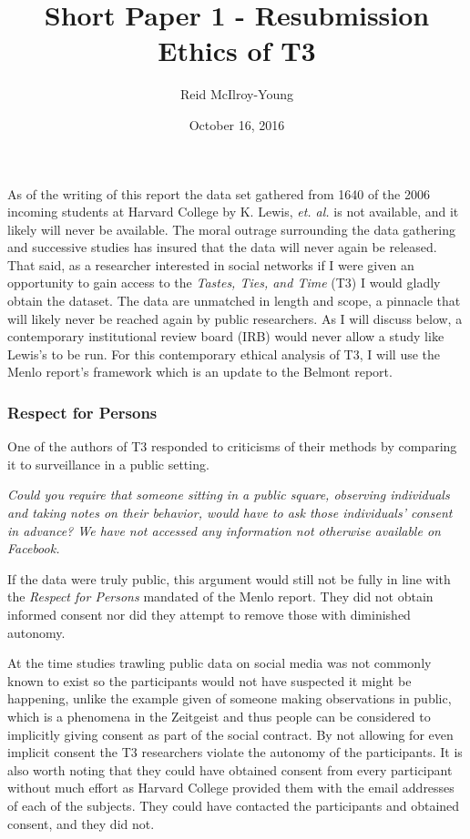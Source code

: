 \documentclass[10pt,a4paper,twocolumn]{article}
\author{Reid McIlroy-Young}
\title{Short Paper 1 - Resubmission\\Ethics of T3}
\date{October 16, 2016}
\begin{document}
\setlength{\droptitle}{-60pt}
\maketitle

As of the writing of this report the data set gathered from 1640 of the 2006 incoming students at Harvard College\cite{zimmerblog} by K. Lewis, \textit{et. al.}\cite{t3} is not available\cite{t3site}, and it likely will never be available. The moral outrage\cite{zimethics} surrounding the data gathering\cite{t3} and successive studies\cite{t3followup1}\cite{t3followup2} has insured that the data will never again be released. That said, as a researcher interested in social networks if I were given an opportunity to gain access to the \textit{Tastes, Ties, and Time} (T3) I would gladly obtain the dataset. The data are unmatched in length and scope, a pinnacle that will likely never be reached again by public researchers. As I will discuss below, a contemporary institutional review board (IRB) would never allow a study like Lewis's to be run. For this contemporary ethical analysis of T3, I will use the Menlo report's\cite{menlo} framework which is an update to the Belmont report\cite{belmont}.

\subsubsection*{Respect for Persons}

One of the authors of T3 responded to criticisms\cite{zimmerblog} of their methods by comparing it to surveillance in a public setting.

\begin{displayquote}
\textit{Could you require that someone sitting in a public square, observing individuals and taking notes on their behavior, would have to ask those individuals’ consent in advance? We have not accessed any information not otherwise available on Facebook.}\cite{zimmerblogcomment}
\end{displayquote}

If the data were truly public, this argument would still not be fully in line with the \textit{Respect for Persons} mandated of the Menlo report. They did not obtain informed consent nor did they attempt to remove those with diminished autonomy.\par

At the time studies trawling public data on social media was not commonly known to exist so the participants would not have suspected it might be happening, unlike the example given of someone making observations in public, which is a phenomena in the Zeitgeist and thus people can be considered to implicitly giving consent as part of the social contract. By not allowing for even implicit consent the T3 researchers violate the autonomy of the participants. It is also worth noting that they could have obtained consent from every participant without much effort as Harvard College provided them with the email addresses of each of the subjects\cite{t3}. They could have contacted the participants and obtained consent, and they did not.\par
\end{document}
